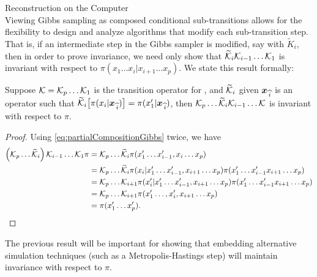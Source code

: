\begin{chapter}{Reconstruction on the Computer}
\begin{equation}
\end{equation}
Viewing Gibbs sampling as composed conditional sub-transitions allows for the flexibility to design and analyze algorithms that modify each sub-transition step. 
That is, if an intermediate step in the Gibbs sampler is modified, say with $\tilde K_i$, then in order to prove invariance, we need only show that $\widetilde {\mathcal K}_i\mathcal K_{i-1}\dots\mathcal K_1$ is invariant with respect to $\pi(x_1\dots x_i|x_{i+1}\dots x_p)$.
We state this result formally:
\begin{cor} \label{cor:conditionalTransition}
  Suppose $\mathcal K = \mathcal K_p\dots\mathcal K_1$ is the transition operator for , and $\widetilde {\mathcal K}_i$ given $\mbox{\boldmath$x$}_{\,\widehat{i}}$ is an operator such that $\widetilde {\mathcal K}_i \big[\pi(x_i|\mbox{\boldmath$x$}_{\,\widehat{i}})\big] = \pi(x_1'|\mbox{\boldmath$x$}_{\,\widehat{i}})$, then $\mathcal K_p\dots\widetilde {\mathcal K}_i\mathcal K_{i-1}\dots\mathcal K$ is invariant with respect to $\pi$.
\end{cor}
\begin{proof} 
  Using \eqref{eq:partialCompositionGibbs} twice, we have 
  \begin{align}
    \left(\mathcal K_p\dots\widetilde {\mathcal K}_i\right)\mathcal K_{i-1}\dots\mathcal K_1 \pi 
      &= \mathcal K_p\dots \widetilde {\mathcal K}_i \pi(x_1'\dots x_{i-1}',x_i\dots x_p) \nonumber\\
      &= \mathcal K_p\dots \widetilde {\mathcal K}_i \pi(x_i|x_1'\dots x_{i-1}',x_{i+1}\dots x_p)\pi(x_1'\dots x_{i-1}'x_{i+1}\dots x_p) \nonumber\\
      &= \mathcal K_p\dots \mathcal K_{i+1}\pi(x_i'|x_1'\dots x_{i-1}',x_{i+1}\dots x_p)\pi(x_1'\dots x_{i-1}'x_{i+1}\dots x_p) \nonumber\\
      &= \mathcal K_p\dots \mathcal K_{i+1}\pi(x_1'\dots ,x_i',x_{i+1}\dots x_p) \nonumber\\
      &= \pi(x_1'\dots x_p').
  \end{align}
\end{proof}
The previous result will be important for showing that embedding alternative simulation techniques (such as a Metropolis-Hastings step) will maintain invariance with respect to $\pi$.


\end{chapter}
